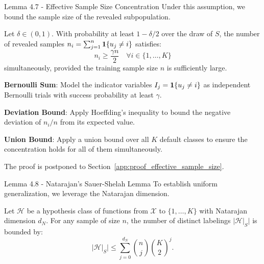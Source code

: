 \begin{faqblock}
\faqanswers
{}
\end{faqblock}

\begin{sourceblock}{Lemma 4.7 - Effective Sample Size Concentration}
Under this assumption, we bound the sample size of the revealed subpopulation.
\begin{lemma}
\label{lem:effective_sample_size}
Let $\delta \in (0, 1)$. With probability at least $1 - \delta/2$ over the draw of $S$, the number of revealed samples $n_i = \sum_{j=1}^n \mathbf{1}\{u_j \ne i\}$ satisfies:
\begin{equation}
    \label{eq:sample_size_concentration}
    n_i \ge \frac{\gamma n}{2} \quad \forall i \in \{1, \dots, K\}
\end{equation}
simultaneously, provided the training sample size $n$ is sufficiently large.
\end{lemma}
\end{sourceblock}

\begin{guideblock}
\item \textbf{Bernoulli Sum}: Model the indicator variables $I_j = \mathbf{1}\{u_j \ne i\}$ as independent Bernoulli trials with success probability at least $\gamma$.
\item \textbf{Deviation Bound}: Apply Hoeffding's inequality to bound the negative deviation of $n_i/n$ from its expected value.
\item \textbf{Union Bound}: Apply a union bound over all $K$ default classes to ensure the concentration holds for all of them simultaneously.
\end{guideblock}
The proof is postponed to Section~\ref{app:proof_effective_sample_size}.

\begin{sourceblock}{Lemma 4.8 - Natarajan's Sauer-Shelah Lemma}
To establish uniform generalization, we leverage the Natarajan dimension.
\begin{lemma}
\label{lem:natarajan_lemma}
Let $\mathcal{H}$ be a hypothesis class of functions from $\mathcal{X}$ to $\{1, \dots, K\}$ with Natarajan dimension $d_N$. For any sample of size $n$, the number of distinct labelings $|\mathcal{H}|_S|$ is bounded by:
\begin{equation}
    \label{eq:natarajan_bound}
    |\mathcal{H}|_S| \le \sum_{j=0}^{d_N} \binom{n}{j} \binom{K}{2}^j.
\end{equation}
\end{lemma}
\end{sourceblock}

